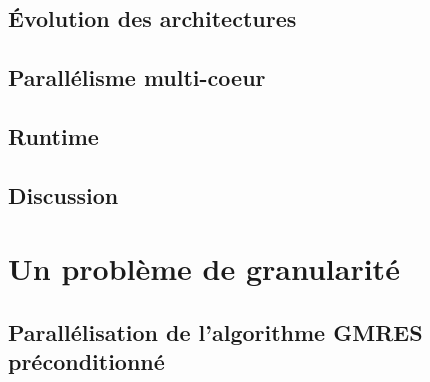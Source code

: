 \documentclass[twoside,10pt]{classes/Thesis}
\begin{document}
\section{\'Evolution des architectures}





%



\section{Parallélisme multi-coeur}






\section{Runtime}





\section{Discussion}



\chapter{Un problème de granularité}
\minitoc
\vspace{1cm}


\section{Parallélisation de l'algorithme GMRES préconditionné}


\end{document}
